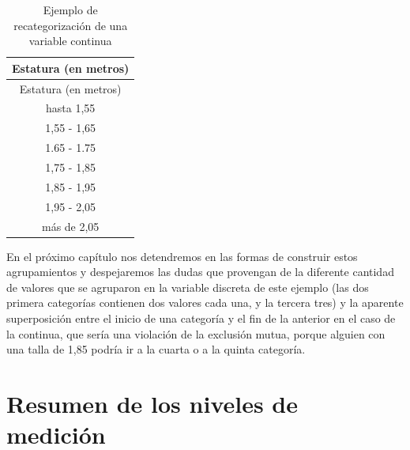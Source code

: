 \documentclass[]{book}
\begin{document}
\begin{longtable}[]{@{}c@{}}
\caption{\label{tab:unnamed-chunk-14}Ejemplo de recategorización de una variable continua}\tabularnewline
\toprule
Estatura (en metros)\tabularnewline
\midrule
\endfirsthead
\toprule
Estatura (en metros)\tabularnewline
\midrule
\endhead
hasta 1,55\tabularnewline
1,55 - 1,65\tabularnewline
1.65 - 1.75\tabularnewline
1,75 - 1,85\tabularnewline
1,85 - 1,95\tabularnewline
1,95 - 2,05\tabularnewline
más de 2,05\tabularnewline
\bottomrule
\end{longtable}

En el próximo capítulo nos detendremos en las formas de construir estos agrupamientos y despejaremos las dudas que provengan de la diferente cantidad de valores que se agruparon en la variable discreta de este ejemplo (las dos primera categorías contienen dos valores cada una, y la tercera tres) y la aparente superposición entre el inicio de una categoría y el fin de la anterior en el caso de la continua, que sería una violación de la exclusión mutua, porque alguien con una talla de 1,85 podría ir a la cuarta o a la quinta categoría.

\hypertarget{resumen-de-los-niveles-de-medicion}{%
\section{Resumen de los niveles de medición}\label{resumen-de-los-niveles-de-medicion}}
\end{document}
